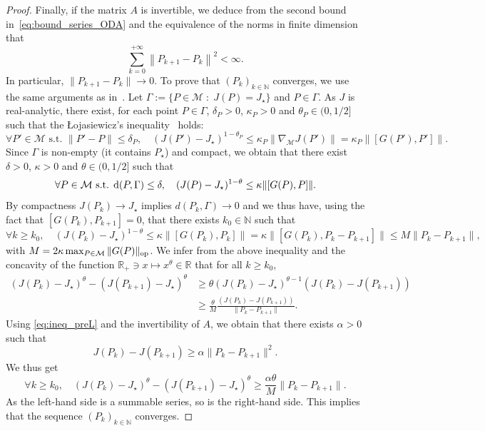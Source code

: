 \documentclass{article}
\def\N{\mathbb N}
\def\R{\mathbb R}
\newcommand{\1}{{\mathds 1}}
\begin{document}
\begin{proof}
Finally, if the matrix $A$ is invertible, we deduce from the second bound in~\eqref{eq:bound_series_ODA} and the equivalence of the norms in finite dimension that
$$
\sum_{k=0}^{+\infty}  \left\| P_{k+1}-P_k  \right\|^2< \infty.
$$
In particular, $\|P_{k+1}-P_k\| \to 0$. To prove that $(P_k)_{k \in \N}$ converges, we use the same arguments as in~\cite{levitt2012b}. Let $\Gamma:=\{P \in \mathcal M \; : \; J(P)=J_\star\}$ and $P \in \Gamma$. As $J$ is real-analytic, there exist,  for each point $P \in \Gamma$, $\delta_P > 0$, $\kappa_P > 0$ and $\theta_P \in (0,1/2]$ such that the \L ojasiewicz's inequality~\cite{Lojasiewicz} holds:
\begin{equation}\label{eq:Lojasiewicz}
\forall P' \in \mathcal M \mbox{ s.t. } \|P'-P\|\le \delta_P, \quad  (J(P')-J_\star)^{1-\theta_P} \le \kappa_P \| \nabla_\mathcal MJ(P')\| = \kappa_P \|[G(P'),P']\|.
\end{equation}
Since $\Gamma$ is non-empty (it contains $P_\star$) and compact, we obtain that there exist $\delta > 0$, $\kappa > 0$ and $\theta \in (0,1/2]$ such that 
$$ 
\forall P \in \mathcal M \mbox{ s.t. } {\rm d}(P,\Gamma) \le \delta, \quad  (J(P)-J_\star)^{1-\theta} \le  \kappa \|[G(P),P]\|.
$$
By compactness $J(P_k)\to J_\star$ implies $d(P_k,\Gamma) \to 0$ and we thus have, using the fact that $[G(P_k),P_{k+1}]=0$, that there exists $k_0 \in \N$ such that
$$
\forall k \ge k_0, \quad (J(P_k)-J_\star)^{1-\theta} \le \kappa \|[G(P_k),P_k]\| = \kappa \|[G(P_k),P_k-P_{k+1}]\| \le M \|P_k-P_{k+1}\|,
$$
with $M=2\kappa \max_{P \in \mathcal M} \|G(P)\|_{\rm op}$.
We infer from the above inequality and the concavity of the function $\R_+ \ni x \mapsto x^\theta \in \R$ that for all $k \ge k_0$,
\begin{align*}
    (J(P_k)-J_\star)^\theta -  (J(P_{k+1})-J_\star)^\theta & \ge \theta (J(P_k)-J_\star)^{\theta-1} \left( J(P_k)-J(P_{k+1}) \right) \\
    & \ge \frac{\theta}{M} \frac{\left( J(P_k)-J(P_{k+1}) \right)}{\|P_k-P_{k+1}\|}.
\end{align*}
Using \eqref{eq:ineq_preL} and the invertibility of $A$, we obtain that there exists $\alpha > 0$ such that
$$
J(P_k)-J(P_{k+1}) \ge \alpha \|P_k-P_{k+1}\|^2.
$$
We thus get 
$$
\forall k \ge k_0, \quad (J(P_k)-J_\star)^\theta -  (J(P_{k+1})-J_\star)^\theta \ge \frac{\alpha\theta}{M} 
\|P_k-P_{k+1}\|.
$$
As the left-hand side is a summable series, so is the right-hand side. This implies that the sequence $(P_k)_{k \in \N}$ converges.
\end{proof}
\end{document}
